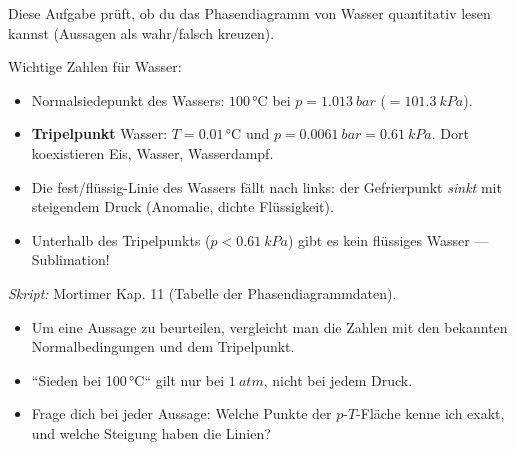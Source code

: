

Diese Aufgabe prüft, ob du das Phasendiagramm von Wasser quantitativ lesen
kannst (Aussagen als wahr/falsch kreuzen).

\begin{werkzeugkasten}
Wichtige Zahlen für Wasser:
\begin{itemize}
  \item Normalsiedepunkt des Wassers: $100\,$°C bei $p = 1.013\ bar$
        ($= 101.3\ kPa$).
  \item \textbf{Tripelpunkt} Wasser: $T = 0.01\,$°C und $p = 0.0061\ bar
        = 0.61\ kPa$. Dort koexistieren Eis, Wasser, Wasserdampf.
  \item Die fest/flüssig-Linie des Wassers fällt nach links:
        der Gefrierpunkt \emph{sinkt} mit steigendem Druck (Anomalie, dichte
        Flüssigkeit).
  \item Unterhalb des Tripelpunkts ($p < 0.61\ kPa$) gibt es kein flüssiges
        Wasser --- Sublimation!
\end{itemize}
\textit{Skript:} Mortimer Kap. 11 (Tabelle der Phasendiagrammdaten).
\end{werkzeugkasten}

\begin{achtung}
\begin{itemize}
  \item Um eine Aussage zu beurteilen, vergleicht man die Zahlen mit den
        bekannten Normalbedingungen und dem Tripelpunkt.
  \item ``Sieden bei 100\,°C`` gilt nur bei $1\ atm$, nicht bei jedem Druck.
  \item Frage dich bei jeder Aussage: Welche Punkte der $p$-$T$-Fläche kenne
        ich exakt, und welche Steigung haben die Linien?
\end{itemize}
\end{achtung}

